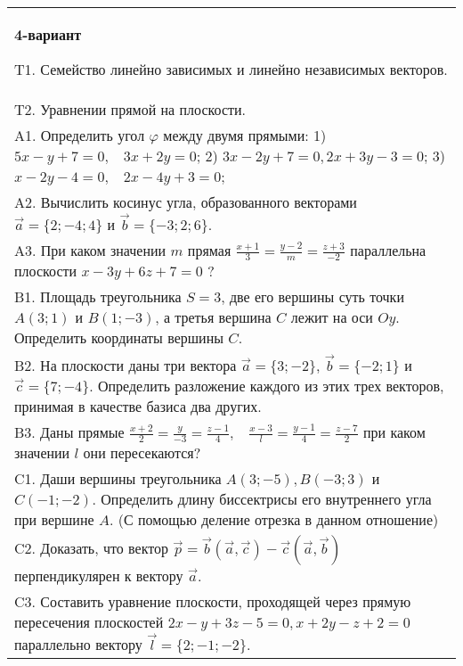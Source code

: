 \documentclass{article}
\begin{document}
\begin{tabular}{m{17cm}}
\textbf{4-вариант}
\newline

T1. 
Семейство линейно зависимых и линейно независимых векторов.
 \\
T2. Уравнении прямой на плоскости.
 \\
A1. 
Определить угол \(\varphi\) между двумя прямыми: 1) \(5x - y + 7 = 0,\ \ \ \ 3x + 2y = 0\); 2) \(3x - 2y + 7 = 0,2x + 3y - 3 = 0\); 3) \(x - 2y - 4 = 0,\ \ \ \ 2x - 4y + 3 = 0\);
 \\
A2. 
Вычислить косинус угла, образованного векторами \(\overrightarrow{a} = \{ 2; - 4;4\}\) и \(\overrightarrow{b} = \{ - 3;2;6\}\).
 \\
A3. 
При каком значении \(m\) прямая \(\frac{x + 1}{3} = \frac{y - 2}{m} = \frac{z + 3}{- 2}\) параллельна плоскости \(x - 3y + 6z + 7 = 0\) ?
 \\
B1. 
Площадь треугольника \(S = 3\), две его вершины суть точки \(A(3;1)\) и \(B(1; - 3)\), а третья вершина \(C\) лежит на оси \(Oy\). Определить координаты вершины \(C\).
 \\
B2. 
На плоскости даны три вектора \(\overrightarrow{a} = \{ 3; - 2\}\), \(\overrightarrow{b} = \{ - 2;1\}\) и \(\overrightarrow{c} = \{ 7; - 4\}\). Определить разложение каждого из этих трех векторов, принимая в качестве базиса два других.
 \\
B3. 
Даны прямые \(\frac{x + 2}{2} = \frac{y}{- 3} = \frac{z - 1}{4},\ \ \ \ \frac{x - 3}{l} = \frac{y - 1}{4} = \frac{z - 7}{2}\) при каком значении \(l\) они пересекаются?
 \\
C1. 
Даши вершины треугольника \(A(3; - 5),B( - 3;3)\) и \(C( - 1; - 2)\). Определить длину биссектрисы его внутреннего угла при вершине \(A\). (С помощью деление отрезка в данном отношение)
 \\
C2. 
Доказать, что вектор \(\overrightarrow{p} = \overrightarrow{b}(\overrightarrow{a},\overrightarrow{c}) - \overrightarrow{c}(\overrightarrow{a},\overrightarrow{b})\) перпендикулярен к вектору \(\overrightarrow{a}\).
 \\
C3. Составить уравнение плоскости, проходящей через прямую пересечения плоскостей \(2x - y + 3z - 5 = 0,x + 2y - z + 2 = 0\) параллельно вектору \(\overrightarrow{l} = \{ 2; - 1; - 2\}\).
 \\

\end{tabular}
\vspace{1cm}
\end{document}
